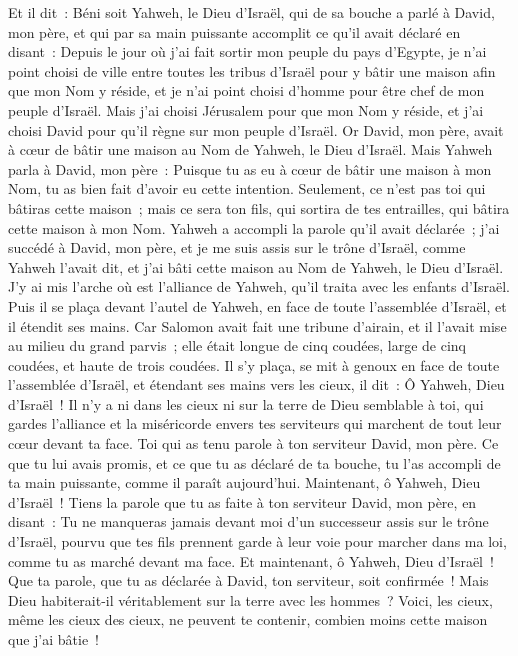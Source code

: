 \begin{multicols}{2}
Et il dit~: Béni soit Yahweh, le Dieu d'Israël, qui de sa bouche a parlé à David, mon père, et qui par sa main puissante accomplit ce qu'il avait déclaré en disant~:
Depuis le jour où j'ai fait sortir mon peuple du pays d'Egypte, je n'ai point choisi de ville entre toutes les tribus d'Israël pour y bâtir une maison afin que mon Nom y réside, et je n'ai point choisi d'homme pour être chef de mon peuple d'Israël.
Mais j'ai choisi Jérusalem pour que mon Nom y réside, et j'ai choisi David pour qu'il règne sur mon peuple d'Israël.
Or David, mon père, avait à cœur de bâtir une maison au Nom de Yahweh, le Dieu d'Israël.
Mais Yahweh parla à David, mon père~: Puisque tu as eu à cœur de bâtir une maison à mon Nom, tu as bien fait d'avoir eu cette intention.
Seulement, ce n'est pas toi qui bâtiras cette maison~; mais ce sera ton fils, qui sortira de tes entrailles, qui bâtira cette maison à mon Nom.
Yahweh a accompli la parole qu'il avait déclarée~; j'ai succédé à David, mon père, et je me suis assis sur le trône d'Israël, comme Yahweh l'avait dit, et j'ai bâti cette maison au Nom de Yahweh, le Dieu d'Israël.
J'y ai mis l'arche où est l'alliance de Yahweh, qu'il traita avec les enfants d'Israël.
Puis il se plaça devant l'autel de Yahweh, en face de toute l'assemblée d'Israël, et il étendit ses mains.
Car Salomon avait fait une tribune d'airain, et il l'avait mise au milieu du grand parvis~; elle était longue de cinq coudées, large de cinq coudées, et haute de trois coudées. Il s'y plaça, se mit à genoux en face de toute l'assemblée d'Israël, et étendant ses mains vers les cieux, il dit~:
Ô Yahweh, Dieu d'Israël~! Il n'y a ni dans les cieux ni sur la terre de Dieu semblable à toi, qui gardes l'alliance et la miséricorde envers tes serviteurs qui marchent de tout leur cœur devant ta face.
Toi qui as tenu parole à ton serviteur David, mon père. Ce que tu lui avais promis, et ce que tu as déclaré de ta bouche, tu l'as accompli de ta main puissante, comme il paraît aujourd'hui.
Maintenant, ô Yahweh, Dieu d'Israël~! Tiens la parole que tu as faite à ton serviteur David, mon père, en disant~: Tu ne manqueras jamais devant moi d'un successeur assis sur le trône d'Israël, pourvu que tes fils prennent garde à leur voie pour marcher dans ma loi, comme tu as marché devant ma face.
Et maintenant, ô Yahweh, Dieu d'Israël~! Que ta parole, que tu as déclarée à David, ton serviteur, soit confirmée~!
Mais Dieu habiterait-il véritablement sur la terre avec les hommes~? Voici, les cieux, même les cieux des cieux, ne peuvent te contenir, combien moins cette maison que j'ai bâtie~!

\end{multicols}
